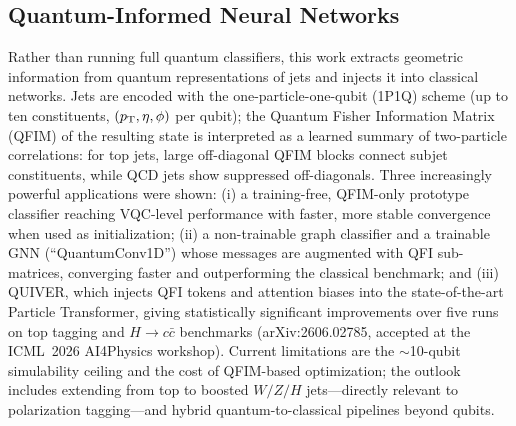 \subsection{Quantum-Informed Neural Networks}
Rather than running full quantum classifiers, this work extracts geometric
information from quantum representations of jets and injects it into classical
networks. Jets are encoded with the one-particle-one-qubit (1P1Q) scheme (up to
ten constituents, $(p_{\mathrm{T}},\eta,\phi)$ per qubit); the Quantum Fisher Information
Matrix (QFIM) of the resulting state is interpreted as a learned summary of
two-particle correlations: for top jets, large off-diagonal QFIM blocks connect
subjet constituents, while QCD jets show suppressed off-diagonals. Three
increasingly powerful applications were shown: (i) a training-free,
QFIM-only prototype classifier reaching VQC-level performance with faster,
more stable convergence when used as initialization; (ii) a non-trainable graph
classifier and a trainable GNN (``QuantumConv1D'') whose messages are augmented
with QFI sub-matrices, converging faster and outperforming the classical
benchmark; and (iii) QUIVER, which injects QFI tokens and attention biases into
the state-of-the-art Particle Transformer, giving statistically significant
improvements over five runs on top tagging and $H\to c\bar c$ benchmarks
(arXiv:2606.02785, accepted at the ICML~2026 AI4Physics workshop). Current
limitations are the $\sim$10-qubit simulability ceiling and the cost of
QFIM-based optimization; the outlook includes extending from top to boosted
$W/Z/H$ jets---directly relevant to polarization tagging---and hybrid
quantum-to-classical pipelines beyond qubits.

